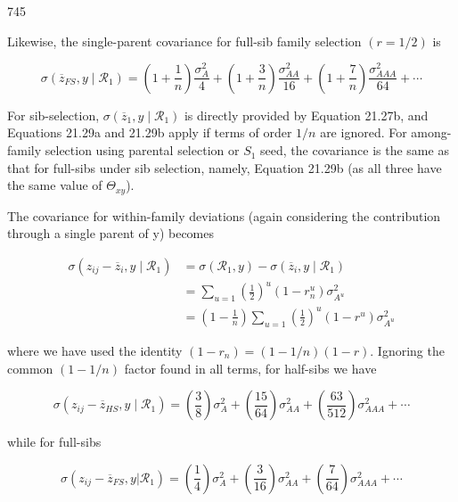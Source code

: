 \documentclass{article}
\begin{document}
745

Likewise, the single-parent covariance for full-sib family selection  $ (r = 1/2) $ is

\begin{equation}
\sigma(\overline{z}_{FS},y\mid\mathcal{R}_{1})=\left(1+\frac{1}{n}\right)\frac{\sigma_{A}^{2}}{4}+\left(1+\frac{3}{n}\right)\frac{\sigma_{AA}^{2}}{16}+\left(1+\frac{7}{n}\right)\frac{\sigma_{AAA}^{2}}{64}+\cdots
\tag{21.29b}
\label{eq:21_29b}
\end{equation}

For sib-selection,  $ \sigma(\overline{z}_1, y \mid \mathcal{R}_1) $ is directly provided by Equation 21.27b, and Equations 21.29a and 21.29b apply if terms of order  $ 1/n $ are ignored. For among-family selection using parental selection or  $ S_1 $ seed, the covariance is the same as that for full-sibs under sib selection, namely, Equation 21.29b (as all three have the same value of  $ \Theta_{xy} $).

The covariance for within-family deviations (again considering the contribution through a single parent of y) becomes

\begin{equation}
\begin{align*}\sigma(z_{ij}-\overline{z}_{i},y\mid\mathcal{R}_{1})&=\sigma(\mathcal{R}_{1},y)-\sigma(\overline{z}_{i},y\mid\mathcal{R}_{1})\\&=\sum_{u=1}\left(\frac{1}{2}\right)^{u}\left(1-r_{n}^{u}\right)\sigma_{A^{u}}^{2}\\&=\left(1-\frac{1}{n}\right)\sum_{u=1}\left(\frac{1}{2}\right)^{u}(1-r^{u})\sigma_{A^{u}}^{2}\end{align*}
\tag{21.30}
\label{eq:21_30}
\end{equation}

where we have used the identity  $ (1-r_n)=(1-1/n)(1-r) $. Ignoring the common  $ (1-1/n) $ factor found in all terms, for half-sibs we have

\begin{equation}
\sigma(z_{i j}-\overline{{z}}_{H S},y\mid\mathcal{R}_{1})=\left(\frac{3}{8}\right)\sigma_{A}^{2}+\left(\frac{15}{64}\right)\sigma_{A A}^{2}+\left(\frac{63}{512}\right)\sigma_{A A A}^{2}+\cdots
\tag{21.31a}
\label{eq:21_31a}
\end{equation}

while for full-sibs

\begin{equation}
\sigma(z_{i j}-\overline{{z}}_{F S},y\left|\mathcal{R}_{1}\right.)=\left(\frac{1}{4}\right)\sigma_{A}^{2}+\left(\frac{3}{16}\right)\sigma_{A A}^{2}+\left(\frac{7}{64}\right)\sigma_{A A A}^{2}+\cdots
\tag{21.31b}
\label{eq:21_31b}
\end{equation}
\end{document}
